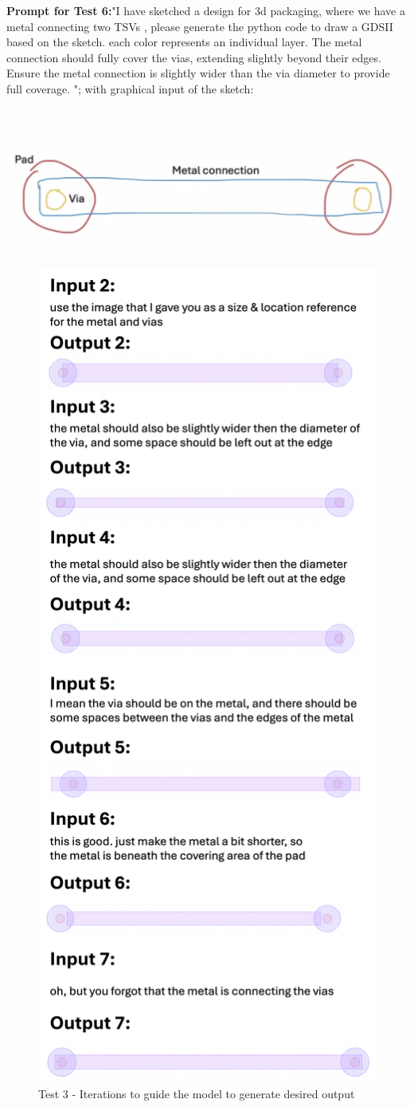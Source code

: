 \documentclass{article}
\begin{document}
\textbf{Prompt for Test 6:}"I have sketched a design for 3d packaging, where we have a metal connecting two TSVs , please generate the python code to draw a GDSII based on the sketch. each color represents an individual layer. The metal connection should fully cover the vias, extending slightly beyond their edges. Ensure the metal connection is slightly wider than the via diameter to provide full coverage.
"; with graphical input of the sketch: 

\includegraphics[width=0.5\linewidth]{sketch.png}


\begin{figure}[!h]
\centering
\includegraphics[width=0.5\linewidth]{Styles/Test3.png}
\caption{Test 3 - Iterations to guide the model to generate desired output}
\label{fig:test3_chat}
\end{figure}
\end{document}
